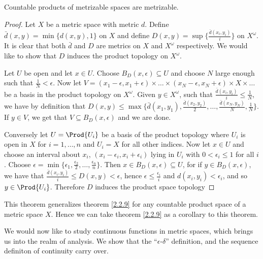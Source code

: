 \begin{theorem}\label{2.3.3}
    Countable products of metrizable spaces are metrizable.
\end{theorem}
\begin{proof}
    Let $X$ be a metric space with metric  $d$. Define
    $\bar{d}(x,y)=\min\{d(x,y),1\}$ on $X$ and define  $D(x,y)=\sup\{\frac{\bar{d}(x_i,y_i)}{i}\}$
    on $X^{\omega}$. It is clear that both $\bar{d}$ and $D$ are metrics on  $X$ and  $X^{\omega}$
    respectively. We would like to show that $D$ induces the product topology on  $X^{\omega}$.

    Let $U$ be open and let  $x \in U$. Choose  $B_D(x,\epsilon) \subseteq U$ and choose $N$ large
    enough such that  $ \frac{1}{N}<\epsilon$. Now let
    $V=(x_1-\epsilon,x_1+\epsilon) \times \dots \times (x_N-\epsilon,x_N+\epsilon) \times X \times \dots$ be a basis in the product topology on
    $X^{\omega}$. Given $y \in X^{\omega}$, such that $\frac{\bar{d}(x_i,y_i)}{i} \leq
    \frac{1}{N}$, we have by definition that $D(x,y) \leq \max\{\bar{d}(x_1,y_1),
    \frac{\bar{d}(x_2,y_2)}{2}, \dots, \frac{\bar{d}(x_N,y_N)}{N}, \frac{1}{N}\}$. If $y \in V$, we
    get that  $V \subseteq B_D(x,\epsilon)$ and we are done.

    Conversely let $U=\Prod{U_i}$ be a basis of the product topology where $U_i$ is open in  $X$
    for  $i=1,\dots,n$ and  $U_i=X$ for all other indices. Now let  $x \in U$ and choose an interval
    about  $x_i$,  $(x_i-\epsilon_i,x_i+\epsilon_i)$ lying in $U_i$ with  $0<\epsilon_i \leq 1$ for
    all  $i$. Choose  $\epsilon=\min\{\epsilon_1,\frac{\epsilon_2}{2}, \dots,
    \frac{\epsilon_n}{n}\}$. Then  $x \in B_D(x,\epsilon) \subseteq U$, for if $y \in
    B_D(x,\epsilon)$, we have that $\frac{\bar{d}(x_i,y_i)}{i} \leq D(x,y)<\epsilon$, hence
    $\epsilon \leq \frac{\epsilon_i}{i}$ and $d(x_i,y_i)<\epsilon_i$, and so $y \in \Prod{U_i}$.
    Therefore $D$ induces the product space topology
\end{proof}
\begin{remark}
    This theorem generalizes theorem \ref{2.2.9} for any countable product space of a metric space
    $X$. Hence we can take theorem \ref {2.2.9} as a corollary to this theorem.
\end{remark}

We would now like to study continuous functions in metric spaces, which brings us into the realm of
analysis. We show that the ``$\epsilon$-$\delta$'' definition, and the sequence definiton of
continuity carry over.

